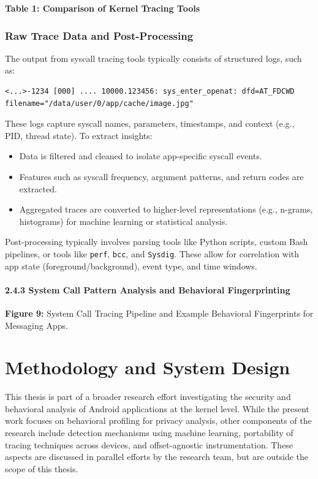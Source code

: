\documentclass[a4paper,12pt]{report}
\begin{document}
\textbf{Table 1: Comparison of Kernel Tracing Tools}


\subsection{Raw Trace Data and Post-Processing}
The output from syscall tracing tools typically consists of structured logs, such as:

\begin{verbatim}
<...>-1234 [000] .... 10000.123456: sys_enter_openat: dfd=AT_FDCWD filename="/data/user/0/app/cache/image.jpg"
\end{verbatim}

These logs capture syscall names, parameters, timestamps, and context (e.g., PID, thread state). To extract insights:

\begin{itemize}
\item Data is filtered and cleaned to isolate app-specific syscall events.
\item Features such as syscall frequency, argument patterns, and return codes are extracted.
\item Aggregated traces are converted to higher-level representations (e.g., n-grams, histograms) for machine learning or statistical analysis.
\end{itemize}

Post-processing typically involves parsing tools like Python scripts, custom Bash pipelines, or tools like \texttt{perf}, \texttt{bcc}, and \texttt{Sysdig}. These allow for correlation with app state (foreground/background), event type, and time windows.

\subsubsection*{2.4.3 System Call Pattern Analysis and Behavioral Fingerprinting}

\textbf{Figure 9:} System Call Tracing Pipeline and Example Behavioral Fingerprints for Messaging Apps.




\chapter{Methodology and System Design}
This thesis is part of a broader research effort investigating the security and behavioral analysis of Android applications at the kernel level. While the present work focuses on behavioral profiling for privacy analysis, other components of the research include detection mechanisms using machine learning, portability of tracing techniques across devices, and offset-agnostic instrumentation. These aspects are discussed in parallel efforts by the research team, but are outside the scope of this thesis.
\end{document}

